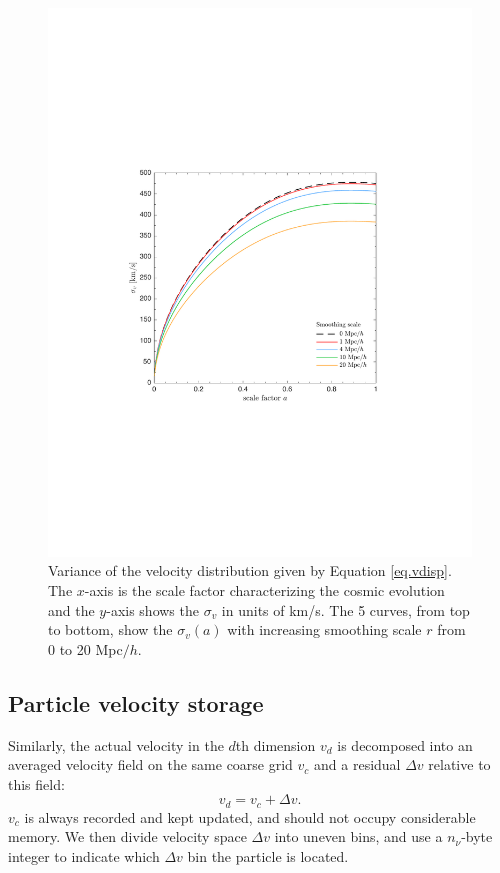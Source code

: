 \documentclass[10pt,twocolumn,preprint]{emulateapj}
\begin{document}
\begin{figure}
\centering
  \includegraphics[width=1\linewidth]{f1}
 \caption{Variance of the velocity distribution given by Equation \ref{eq.vdisp}. The $x$-axis is the scale factor characterizing the cosmic evolution and the $y$-axis shows the $\sigma_v$ in units of km/s. The 5 curves, from top to bottom, show the $\sigma_v(a)$ with increasing smoothing scale $r$ from 0 to 20 Mpc$/h$.}
\label{fig.vdisp}
\end{figure}

\subsection{Particle velocity storage}\label{ss.velocity}
Similarly, the actual velocity in the $d$th dimension $v_d$ is decomposed into an averaged velocity field on the same coarse grid $v_c$ and a residual $\Delta v$ relative to this field:
\begin{equation}\label{eq.deltav}
	v_d=v_c+\Delta v.
\end{equation}
$v_c$ is always recorded and kept updated, and should not occupy considerable memory. We then divide velocity space $\Delta v$ into uneven bins, and use a $n_\nu$-byte integer to indicate which $\Delta v$ bin the particle is located.
\end{document}
